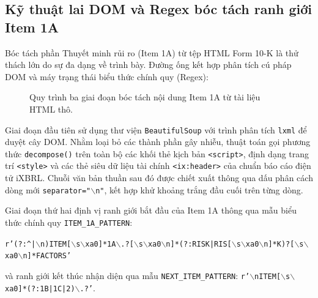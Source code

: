 \subsection{Kỹ thuật lai DOM và Regex bóc tách ranh giới Item 1A}
Bóc tách phần Thuyết minh rủi ro (Item 1A) từ tệp HTML Form 10-K là thử thách lớn do sự đa dạng về trình bày. Đường ống kết hợp phân tích cú pháp DOM và máy trạng thái biểu thức chính quy (Regex):

\begin{figure}[htbp]
    \centering
    \caption{Quy trình ba giai đoạn bóc tách nội dung Item 1A từ tài liệu HTML thô.}
    \label{fig:extraction_flow}
\end{figure}

Giai đoạn đầu tiên sử dụng thư viện \texttt{BeautifulSoup} với trình phân tích \texttt{lxml} để duyệt cây DOM. Nhằm loại bỏ các thành phần gây nhiễu, thuật toán gọi phương thức \texttt{decompose()} trên toàn bộ các khối thẻ kịch bản \texttt{<script>}, định dạng trang trí \texttt{<style>} và các thẻ siêu dữ liệu tài chính \texttt{<ix:header>} của chuẩn báo cáo điện tử iXBRL. Chuỗi văn bản thuần sau đó được chiết xuất thông qua dấu phân cách dòng mới \texttt{separator="$\backslash$n"}, kết hợp khử khoảng trắng đầu cuối trên từng dòng.

Giai đoạn thứ hai định vị ranh giới bắt đầu của Item 1A thông qua mẫu biểu thức chính quy \texttt{ITEM\_1A\_PATTERN}:
\begin{center}
\scriptsize\texttt{r'(?:\^{}|$\backslash$n)ITEM[$\backslash$s$\backslash$xa0]*1A$\backslash$.?[$\backslash$s$\backslash$xa0$\backslash$n]*(?:RISK|RIS[$\backslash$s$\backslash$xa0$\backslash$n]*K)?[$\backslash$s$\backslash$xa0$\backslash$n]*FACTORS'}
\end{center}
và ranh giới kết thúc nhận diện qua mẫu \texttt{NEXT\_ITEM\_PATTERN}: \texttt{r'$\backslash$nITEM[$\backslash$s$\backslash$xa0]*(?:1B|1C|2)$\backslash$.?'}.


